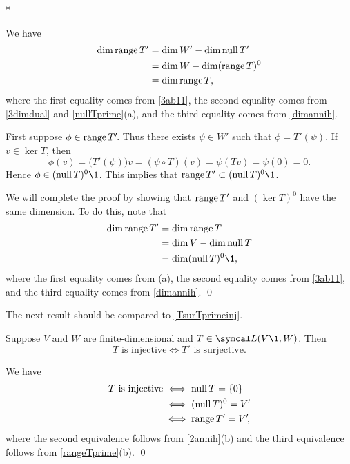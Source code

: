 \proof


\begin{subtheorem}*
\item
We have
\begin{align*}
\dim \operatorname{range} T' &= \dim W' - \dim \operatorname{null} T'\\
&= \dim W - \dim (\operatorname{range} T)^0 \\
&= \dim \operatorname{range} T,
\end{align*}
where the first equality comes from \ref{3ab11}, the second equality comes from \ref{3dimdual} and \ref{nullTprime}(a), and the third equality comes from \ref{dimannih}.

\item
First suppose $\phi \in \operatorname{range} T'\!$. Thus there exists $\psi \in W'$ such that $\phi = T' \! (\psi)$. If $v \in \ker T$, then
\[
\phi(v) = \bigl(T' \! (\psi)\bigr) v = (\psi \circ T)(v) = \psi(Tv) = \psi(0) = 0.
\]
Hence $\phi \in (\ker T)^0\1$. This implies that $\ran T' \subset (\ker T)^0\1$.

We will complete the proof by showing that $\operatorname{range} T'$ and $(\ker T)^0$ have the same dimension. To do this, note that
\begin{align*}
\dim \ran T' &= \dim \ran T \\
&= \dim V - \dim \ker T \\
&= \dim (\ker T)^0\1,
\end{align*}
where the first equality comes from (a), the second equality comes from \ref{3ab11}, and the third equality comes from \ref{dimannih}.
\qed
\end{subtheorem}

The next result should be compared to \ref{TsurTprimeinj}.

{Suppose $V$ and $W$ are finite-dimensional and $T \in \L(V\1, W)$. Then
\[
T \text{ is injective} \iff T' \text{ is surjective}.
\]}

\proof
We have
\begin{align*}
T \text{ is injective} &\iff \operatorname{null} T = \{0\} \\
&\iff (\operatorname{null} T)^0 = V' \\
&\iff \operatorname{range} T' = V' \!,
\end{align*}
where the second equivalence follows from \ref{2annih}(b) and the third equivalence follows from \ref{rangeTprime}(b).
\qed

